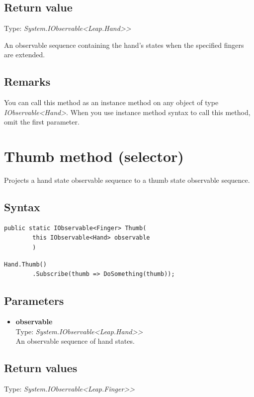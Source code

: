 \documentclass[12pt,a4paper,twoside]{report}
\begin{document}
\subsection{Return value}
Type: \textit{System.IObservable<Leap.Hand>{}>}

An observable sequence containing the hand's states when the specified fingers are extended.

\subsection{Remarks}
You can call this method as an instance method on any object of type \textit{IObservable<Hand>}. When you use 
instance method syntax to call this method, omit the first parameter.

\section{Thumb method (selector)}
Projects a hand state observable sequence to a thumb state observable sequence.

\subsection{Syntax}

\begin{lstlisting}[caption=Declaration]
    public static IObservable<Finger> Thumb(
        this IObservable<Hand> observable
        )
\end{lstlisting}

\begin{lstlisting}[caption=Usage example]
    Hand.Thumb()
        .Subscribe(thumb => DoSomething(thumb));
\end{lstlisting}

\subsection{Parameters}
\begin{itemize}
    \item \textbf{observable}\\
        Type: \textit{System.IObservable<Leap.Hand>{}>}\\
        An observable sequence of hand states.
\end{itemize}

\subsection{Return values}
Type: \textit{System.IObservable<Leap.Finger>{}>}
\end{document}

